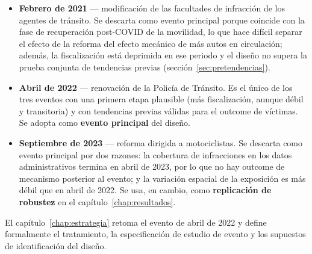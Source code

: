 \begin{itemize}
  \item \textbf{Febrero de 2021} — modificación de las facultades de
  infracción de los agentes de tránsito. Se descarta como evento principal
  porque coincide con la fase de recuperación post-COVID de la movilidad, lo
  que hace difícil separar el efecto de la reforma del efecto mecánico de
  más autos en circulación; además, la fiscalización está deprimida en ese
  periodo y el diseño no supera la prueba conjunta de tendencias previas
  (sección~\ref{sec:pretendencias}).
  \item \textbf{Abril de 2022} — renovación de la Policía de Tránsito. Es el
  único de los tres eventos con una primera etapa plausible (más
  fiscalización, aunque débil y transitoria) y con tendencias previas
  válidas para el outcome de víctimas. Se adopta como \textbf{evento
  principal} del diseño.
  \item \textbf{Septiembre de 2023} — reforma dirigida a motociclistas. Se
  descarta como evento principal por dos razones: la cobertura de
  infracciones en los datos administrativos termina en abril de 2023, por lo
  que no hay outcome de mecanismo posterior al evento; y la variación
  espacial de la exposición es más débil que en abril de 2022. Se usa, en
  cambio, como \textbf{replicación de robustez} en el
  capítulo~\ref{chap:resultados}.
\end{itemize}

El capítulo~\ref{chap:estrategia} retoma el evento de abril de 2022 y define
formalmente el tratamiento, la especificación de estudio de evento y los
supuestos de identificación del diseño.
